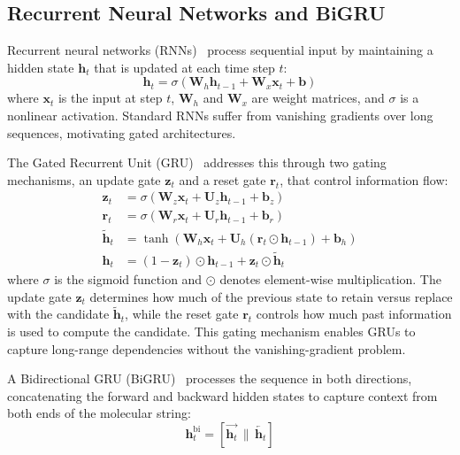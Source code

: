\documentclass[journal=jcisd8,manuscript=suppinfo]{achemso}
\newcommand{\vect}[1]{\mathbf{#1}}
\newcommand{\matr}[1]{\mathbf{#1}}
\begin{document}
\subsection*{Recurrent Neural Networks and BiGRU}

Recurrent neural networks (RNNs)~\cite{elman1990finding} process sequential input by maintaining a hidden state $\vect{h}_t$ that is updated at each time step $t$:
\begin{equation}
 \vect{h}_t = \sigma(\matr{W}_h \vect{h}_{t-1} + \matr{W}_x \vect{x}_t + \vect{b})
 \label{eq:si_rnn}
\end{equation}
where $\vect{x}_t$ is the input at step $t$, $\matr{W}_h$ and $\matr{W}_x$ are weight matrices, and $\sigma$ is a nonlinear activation. Standard RNNs suffer from vanishing gradients over long sequences, motivating gated architectures.

The Gated Recurrent Unit (GRU)~\cite{cho2014learning} addresses this through two gating mechanisms, an update gate $\vect{z}_t$ and a reset gate $\vect{r}_t$, that control information flow:
\begin{align}
 \vect{z}_t &= \sigma(\matr{W}_z \vect{x}_t + \matr{U}_z \vect{h}_{t-1} + \vect{b}_z) \label{eq:si_gru_update} \\
 \vect{r}_t &= \sigma(\matr{W}_r \vect{x}_t + \matr{U}_r \vect{h}_{t-1} + \vect{b}_r) \label{eq:si_gru_reset} \\
 \tilde{\vect{h}}_t &= \tanh(\matr{W}_h \vect{x}_t + \matr{U}_h (\vect{r}_t \odot \vect{h}_{t-1}) + \vect{b}_h) \label{eq:si_gru_candidate} \\
 \vect{h}_t &= (1 - \vect{z}_t) \odot \vect{h}_{t-1} + \vect{z}_t \odot \tilde{\vect{h}}_t \label{eq:si_gru_output}
\end{align}
where $\sigma$ is the sigmoid function and $\odot$ denotes element-wise multiplication. The update gate $\vect{z}_t$ determines how much of the previous state to retain versus replace with the candidate $\tilde{\vect{h}}_t$, while the reset gate $\vect{r}_t$ controls how much past information is used to compute the candidate. This gating mechanism enables GRUs to capture long-range dependencies without the vanishing-gradient problem.

A Bidirectional GRU (BiGRU)~\cite{schuster1997bidirectional} processes the sequence in both directions, concatenating the forward and backward hidden states to capture context from both ends of the molecular string:
\begin{equation}
 \vect{h}_t^{\text{bi}} = [\overrightarrow{\vect{h}_t} \,\|\, \overleftarrow{\vect{h}_t}]
 \label{eq:si_bigru_concat}
\end{equation}
\end{document}
